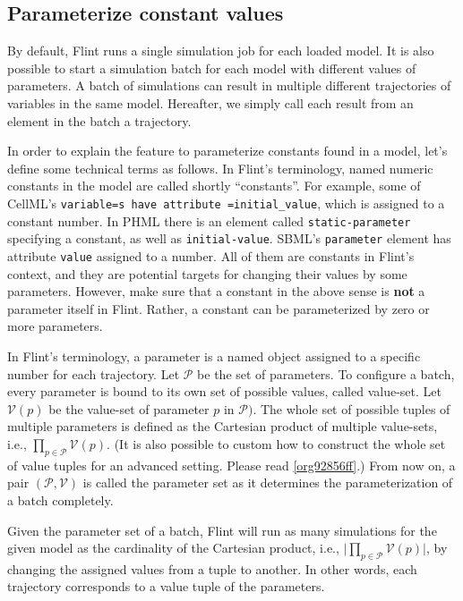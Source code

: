 \documentclass[a4paper,10pt]{report}
\begin{document}
\subsection{Parameterize constant values}
\label{sec:orgc555937}
By default, Flint runs a single simulation job for each loaded model.
It is also possible to start a simulation batch for each model with
different values of parameters.
A batch of simulations can result in multiple different trajectories of
variables in the same model. Hereafter, we simply call each result from
an element in the batch a trajectory.

In order to explain the feature to parameterize constants found in a model,
let's define some technical terms as follows.
In Flint's terminology, named numeric constants in the model are called
shortly ``constants''.
For example, some of CellML's \texttt{variable=s have attribute
=initial\_value}, which is assigned to a constant number.
In PHML there is an element called \texttt{static-parameter} specifying a constant,
as well as \texttt{initial-value}.
SBML's \texttt{parameter} element has attribute \texttt{value} assigned to a number.
All of them are constants in Flint's context, and they are potential targets for
changing their values by some parameters.
However, make sure that a constant in the above sense is \textbf{not} a parameter
itself in Flint.
Rather, a constant can be parameterized by zero or more parameters.

In Flint's terminology, a parameter is a named object assigned to a specific
number for each trajectory.
Let \(\mathcal{P}\) be the set of parameters.
To configure a batch, every parameter is bound to its own set of possible
values, called value-set.
Let \(\mathcal{V}(p)\) be the value-set of parameter \(p\) in \(\mathcal{P})\).
The whole set of possible tuples of multiple parameters is defined as the
Cartesian product of multiple value-sets, i.e., \(\prod_{p \in \mathcal{P}}
\mathcal{V}(p)\).
(It is also possible to custom how to construct the whole set of value tuples
for an advanced setting. Please read \ref{org92856ff}.)
From now on, a pair \((\mathcal{P}, \mathcal{V})\) is called the parameter set as
it determines the parameterization of a batch completely.

Given the parameter set of a batch, Flint will run as many simulations for the
given model as the cardinality of the Cartesian product, i.e.,
\(\lvert \prod_{p \in \mathcal{P}} \mathcal{V}(p) \rvert\), by changing the
assigned values from a tuple to another.
In other words, each trajectory corresponds to a value tuple of the parameters.
\end{document}
